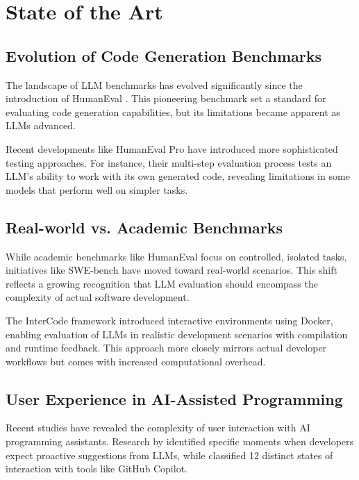 \chapter{State of the Art}

\section{Evolution of Code Generation Benchmarks}

The landscape of LLM benchmarks has evolved significantly since the introduction of HumanEval \cite{chen2021evaluatinglargelanguagemodels}. This pioneering benchmark set a standard for evaluating code generation capabilities, but its limitations became apparent as LLMs advanced.

Recent developments like HumanEval Pro \cite{yu2024humanevalprombpppro} have introduced more sophisticated testing approaches. For instance, their multi-step evaluation process tests an LLM's ability to work with its own generated code, revealing limitations in some models that perform well on simpler tasks.

\section{Real-world vs. Academic Benchmarks}

While academic benchmarks like HumanEval focus on controlled, isolated tasks, initiatives like SWE-bench \cite{jimenez2024swebenchlanguagemodelsresolve} have moved toward real-world scenarios. This shift reflects a growing recognition that LLM evaluation should encompass the complexity of actual software development.

The InterCode framework \cite{yang2023intercodestandardizingbenchmarkinginteractive} introduced interactive environments using Docker, enabling evaluation of LLMs in realistic development scenarios with compilation and runtime feedback. This approach more closely mirrors actual developer workflows but comes with increased computational overhead.

\section{User Experience in AI-Assisted Programming}

Recent studies have revealed the complexity of user interaction with AI programming assistants. Research by \cite{chen2025needhelpdesigningproactive} identified specific moments when developers expect proactive suggestions from LLMs, while \cite{mozannar2024readinglinesmodelinguser} classified 12 distinct states of interaction with tools like GitHub Copilot.

